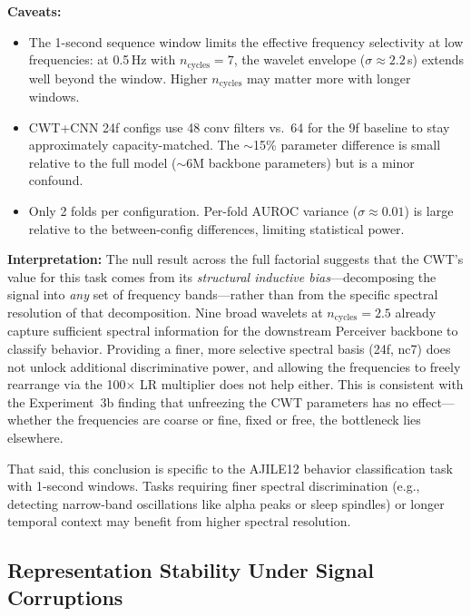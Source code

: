 \documentclass[11pt, a4paper]{article}
\begin{document}
\textbf{Caveats:}
\begin{itemize}[nosep]
      \item The 1-second sequence window limits the effective frequency
            selectivity at low frequencies: at 0.5\,Hz with
            $n_\text{cycles}=7$, the wavelet envelope
            ($\sigma \approx 2.2$\,s) extends well beyond the window.
            Higher $n_\text{cycles}$ may matter more with longer
            windows.
      \item CWT+CNN 24f configs use 48 conv filters vs.\ 64 for the 9f
            baseline to stay approximately capacity-matched.  The
            $\sim$15\% parameter difference is small relative to the
            full model ($\sim$6M backbone parameters) but is a minor
            confound.
      \item Only 2 folds per configuration.  Per-fold AUROC variance
            ($\sigma \approx 0.01$) is large relative to the between-config
            differences, limiting statistical power.
\end{itemize}

\textbf{Interpretation:} The null result across the full factorial
suggests that the CWT's value for this task comes from its
\emph{structural inductive bias}---decomposing the signal into
\emph{any} set of frequency bands---rather than from the specific
spectral resolution of that decomposition.  Nine broad wavelets at
$n_\text{cycles} = 2.5$ already capture sufficient spectral information
for the downstream Perceiver backbone to classify behavior.  Providing
a finer, more selective spectral basis (24f, nc7) does not unlock
additional discriminative power, and allowing the frequencies to freely
rearrange via the 100$\times$ LR multiplier does not help either.
This is consistent with the Experiment~3b finding that unfreezing the
CWT parameters has no effect---whether the frequencies are coarse or
fine, fixed or free, the bottleneck lies elsewhere.

That said, this conclusion is specific to the AJILE12 behavior
classification task with 1-second windows.  Tasks requiring finer
spectral discrimination (e.g., detecting narrow-band oscillations like
alpha peaks or sleep spindles) or longer temporal context may benefit
from higher spectral resolution.


\subsection{Representation Stability Under Signal Corruptions}
\label{sec:cwt-stability}
\end{document}
